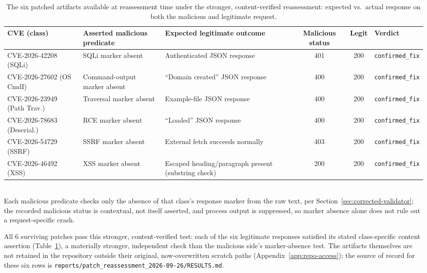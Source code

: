 \documentclass[12pt,a4paper]{report}
\begin{document}
\begin{table}[H]
\centering
\caption{The six patched artifacts available at reassessment time under the stronger, content-verified reassessment: expected vs.\ actual response on both the malicious and legitimate request.}
\label{tab:six-survivors}
\small
\begin{tabular}{@{}p{2.3cm}p{2.6cm}p{2.7cm}ccl@{}}
\toprule
\textbf{CVE (class)} & \textbf{Asserted malicious predicate} & \textbf{Expected legitimate outcome} & \textbf{Malicious status} & \textbf{Legit} & \textbf{Verdict} \\
\midrule
CVE-2026-42208 (SQLi) & SQLi marker absent & Authenticated JSON response & 401 & 200 & \texttt{confirmed\_fix} \\
CVE-2026-27602 (OS CmdI) & Command-output marker absent & ``Domain created'' JSON response & 400 & 200 & \texttt{confirmed\_fix} \\
CVE-2026-23949 (Path Trav.) & Traversal marker absent & Example-file JSON response & 400 & 200 & \texttt{confirmed\_fix} \\
CVE-2026-78683 (Deserial.) & RCE marker absent & ``Loaded'' JSON response & 400 & 200 & \texttt{confirmed\_fix} \\
CVE-2026-54729 (SSRF) & SSRF marker absent & External fetch succeeds normally & 403 & 200 & \texttt{confirmed\_fix} \\
CVE-2026-46492 (XSS) & XSS marker absent & Escaped heading/paragraph present (substring check) & 200 & 200 & \texttt{confirmed\_fix} \\
\bottomrule
\end{tabular}
\\[2pt]
\footnotesize Each malicious predicate checks only the absence of that class's response marker from the raw text, per Section~\ref{sec:corrected-validator}; the recorded malicious status is contextual, not itself asserted, and process output is suppressed, so marker absence alone does not rule out a request-specific crash.
\end{table}

All 6 surviving patches pass this stronger, content-verified test: each of the six legitimate responses satisfied its stated class-specific content assertion (Table~\ref{tab:six-survivors}), a materially stronger, independent check than the malicious side's marker-absence test. The artifacts themselves are not retained in the repository outside their original, now-overwritten scratch paths (Appendix~\ref{app:repo-access}); the source of record for these six rows is \texttt{reports/patch\_reassessment\_2026-09-26/RESULTS.md}.
\end{document}
